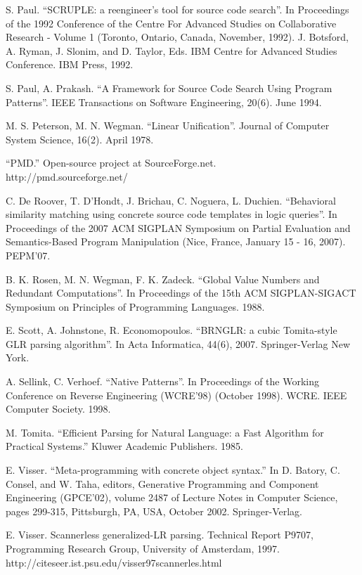 \documentclass{sigplanconf}
\begin{document}
\begin{thebibliography}{10}
 S. Paul. ``SCRUPLE: a reengineer's tool for source
code search''. In Proceedings of the 1992 Conference of the Centre For
Advanced Studies on Collaborative Research - Volume 1 (Toronto,
Ontario, Canada, November, 1992). J. Botsford, A. Ryman, J. Slonim,
and D. Taylor, Eds. IBM Centre for Advanced Studies Conference. IBM
Press, 1992.

 S. Paul, A. Prakash. ``A Framework for Source Code
Search Using Program Patterns''. IEEE Transactions on Software
Engineering, 20(6). June 1994.

 M. S. Peterson, M. N. Wegman. ``Linear
Unification''. Journal of Computer System Science, 16(2). April 1978.

 ``PMD.'' Open-source project at SourceForge.net. \\
http://pmd.sourceforge.net/

 C. De Roover, T. D'Hondt, J. Brichau, C. Noguera,
L. Duchien. ``Behavioral similarity matching using concrete source
code templates in logic queries''. In Proceedings of the 2007 ACM
SIGPLAN Symposium on Partial Evaluation and Semantics-Based Program
Manipulation (Nice, France, January 15 - 16, 2007). PEPM'07.

 B. K. Rosen, M. N. Wegman, F. K. Zadeck. ``Global Value
Numbers and Redundant Computations''. In Proceedings of the 15th ACM
SIGPLAN-SIGACT Symposium on Principles of Programming Languages. 1988.

 E. Scott, A. Johnstone, R. Economopoulos. ``BRNGLR: a
cubic Tomita-style GLR parsing algorithm''. In Acta Informatica, 44(6),
2007. Springer-Verlag New York.

 A. Sellink, C. Verhoef. ``Native Patterns''. In
Proceedings of the Working Conference on Reverse Engineering (WCRE'98)
(October 1998). WCRE. IEEE Computer Society. 1998.

 M. Tomita. ``Efficient Parsing for Natural Language: a
Fast Algorithm for Practical Systems.'' Kluwer Academic
Publishers. 1985.

 E. Visser. ``Meta-programming with concrete object
syntax.'' In D. Batory, C. Consel, and W. Taha, editors, Generative
Programming and Component Engineering (GPCE'02), volume 2487 of
Lecture Notes in Computer Science, pages 299-315, Pittsburgh, PA, USA,
October 2002. Springer-Verlag.

 E. Visser. Scannerless generalized-LR
parsing. Technical Report P9707, Programming Research Group,
University of Amsterdam,
1997. http://citeseer.ist.psu.edu/visser97scannerles.html


\end{thebibliography}
\end{document}
